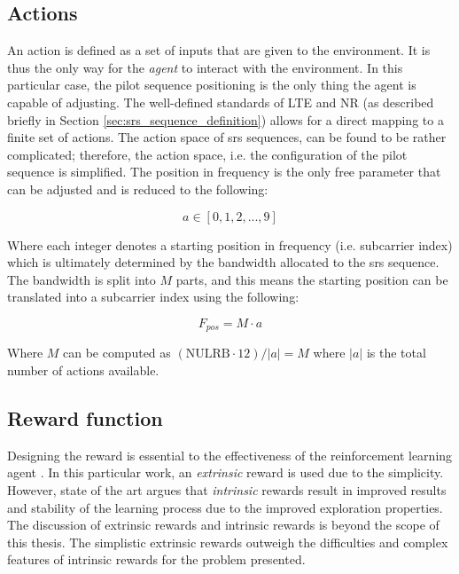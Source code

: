 \subsection{Actions}
An action is defined as a set of inputs that are given to the environment. It is thus the only way for the \emph{agent} to interact with the environment. In this particular case, the pilot sequence positioning is the only thing the agent is capable of adjusting. The well-defined standards of LTE and NR (as described briefly in Section \ref{sec:srs_sequence_definition}) allows for a direct mapping to a finite set of actions. The action space of \gls{srs} sequences, can be found to be rather complicated; therefore, the action space, i.e. the configuration of the pilot sequence is simplified. The position in frequency is the only free parameter that can be adjusted and is reduced to the following: 

\begin{equation}
   a \in [0, 1, 2, ..., 9]
\end{equation}

Where each integer denotes a starting position in frequency (i.e. subcarrier index) which is ultimately determined by the bandwidth allocated to the \gls{srs} sequence. The bandwidth is split into $M$ parts, and this means the starting position can be translated into a subcarrier index using the following:

\begin{equation}
    F_{pos} = M \cdot a
\end{equation}

Where $M$ can be computed as $(\text{NULRB} \cdot 12) / |a| = M$ where $|a|$ is the total number of actions available. 

\subsection{Reward function}

Designing the reward is essential to the effectiveness of the reinforcement learning agent \cite{Sutton2017ReinforcementSecond}. In this particular work, an \emph{extrinsic} reward is used due to the simplicity. However, state of the art argues that \emph{intrinsic} rewards result in improved results and stability of the learning process \cite{SinghIntrinsicallyLearning} due to the improved exploration properties. The discussion of extrinsic rewards and intrinsic rewards is beyond the scope of this thesis. The simplistic extrinsic rewards outweigh the difficulties and complex features of intrinsic rewards for the problem presented. 

